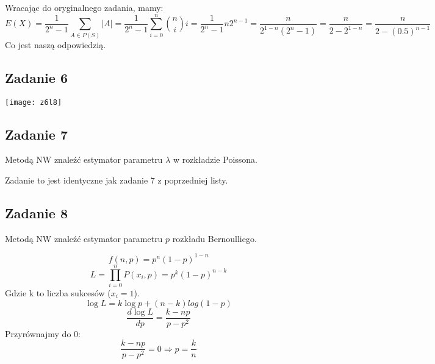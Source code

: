\documentclass[a4paper]{article}
\begin{document}
Wracając do oryginalnego zadania, mamy:
$$E(X)=\frac{1}{2^n-1}\sum_{A\in P(S)}|A|=\frac{1}{2^n-1}\sum_{i=0}^n {n \choose i} i = \frac{1}{2^n-1}n2^{n-1}=\frac{n}{2^{1-n}(2^n-1)}=\frac{n}{2-2^{1-n}}=\frac{n}{2-(0.5)^{n-1}} $$
Co jest naszą odpowiedzią.

\subsection*{Zadanie 6}

\texttt{[image: z6l8]}\\

\subsection*{Zadanie 7}
Metodą NW znaleźć estymator parametru $\lambda$ w rozkładzie Poissona.

Zadanie to jest identyczne jak zadanie $7$ z poprzedniej listy.

\subsection*{Zadanie 8}
Metodą NW znaleźć estymator parametru $p$ rozkładu Bernoulliego.

$$f(n,p)=p^n(1-p)^{1-n}$$
$$L=\prod\limits_{i=0}^n P(x_i, p) = p^k(1-p)^{n-k}$$
Gdzie k to liczba sukcesów ($x_i = 1$). 
$$\log{L}=k \log{p} + (n-k) log{(1-p)}$$
$$\frac{d\log{L}}{dp} = \frac{k-np}{p-p^2}$$
Przyrównajmy do 0:
$$\frac{k-np}{p-p^2} = 0 \Rightarrow p=\frac{k}{n}$$
\end{document}
